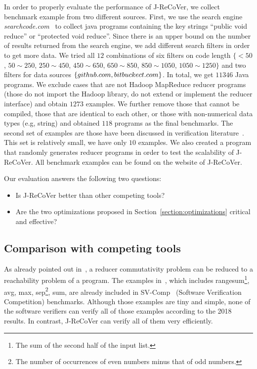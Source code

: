 \documentclass{llncs}
\begin{document}
In order to properly evaluate the performance of J-ReCoVer, we collect benchmark example from two different sources.
First, we use the search engine \emph{searchcode.com}~\cite{searchcode} to collect java programs containing the key strings ``public void reduce'' or ``protected void reduce''. Since there is an upper bound on the number of results returned from the search engine, we add different search filters in order to get more data. We tried all $12$ combinations of six filters on code length $\{<50$, $ 50\sim 250$, $250\sim 450$, $450\sim 650$, $650\sim 850$, $850\sim 1050$, $1050\sim 1250\}$
and two filters for data sources $\{github.com, bitbuckect.com\}$. In total, we get $11346$ Java programs. We exclude cases that are not Hadoop MapReduce reducer programs (those do not import the Hadoop library, do not extend or implement the reducer interface) and obtain $1273$ examples. We further remove those that cannot be compiled, those that are identical to each other, or those with non-numerical data types (e.g, string) and obtained $118$ programs as the final benchmarks.
The second set of examples are those have been discussed in verification literature~\cite{ChenHSW15,ChenSW16}. This set is relatively small, we have only $10$ examples.
We also created a program that randomly generates reducer programs in order to test the scalability of J-ReCoVer.
All benchmark examples can be found on the website of J-ReCoVer.

Our evaluation answers the following two questions:
\begin{itemize}
	\item Is J-ReCoVer better than other competing tools?
	\item Are the two optimizations proposed in Section~\ref{section:optimizations} critical and effective?
\end{itemize}

\subsection{Comparison with competing tools}
As already pointed out in~\cite{ChenHSW15}, a reducer commutativity problem can be reduced to a reachability problem of a program.
The examples in~\cite{ChenHSW15}, which includes \textsf{rangesum}\footnote{The sum of the second half of the input list.}, \textsf{avg}, \textsf{max}, \textsf{sep}\footnote{The number of occurrences of even numbers minus that of odd numbers.}, \textsf{sum}, are already included in SV-Comp~\cite{svcomp} (Software Verification Competition) benchmarks.
Although those examples are tiny and simple, none of the software verifiers can verify all of those examples according to the 2018 results. In contrast, J-ReCoVer can verify all of them very efficiently.
\end{document}
